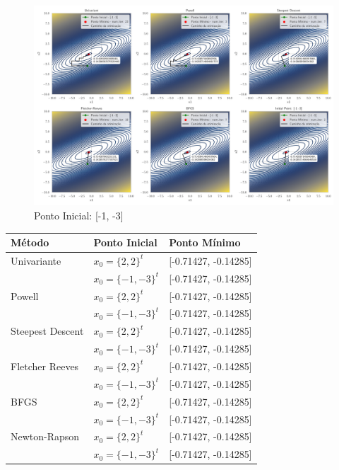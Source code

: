 \documentclass[12pt]{article}
\begin{document}
\begin{figure}[H]
  \centering
  \caption{Ponto Inicial: [-1, -3]}
  \includegraphics[scale=0.4]{img/questao_1a_[-1 -3].pdf}
\end{figure}

\begin{table}[H]
  \centering
  \begin{tabular}{lll}
    \hline
    \textbf{Método} & \textbf{Ponto Inicial} & \textbf{Ponto Mínimo} \\\hline
    Univariante & $x_{0} =\{2,2\}^{t}$ & [-0.71427, -0.14285]\\
     & $x_{0}=\{-1,-3\}^{t}$ & [-0.71427, -0.14285] \\\hline 
    Powell & $x_{0} =\{2,2\}^{t}$ & [-0.71427, -0.14285]\\
     & $x_{0}=\{-1,-3\}^{t}$ & [-0.71427, -0.14285] \\\hline 
    Steepest Descent & $x_{0} =\{2,2\}^{t}$ & [-0.71427, -0.14285] \\
     & $x_{0}=\{-1,-3\}^{t}$ & [-0.71427, -0.14285] \\\hline 
    Fletcher Reeves & $x_{0} =\{2,2\}^{t}$ & [-0.71427, -0.14285] \\
     & $x_{0}=\{-1,-3\}^{t}$ & [-0.71427, -0.14285] \\\hline 
    BFGS & $x_{0} =\{2,2\}^{t}$ & [-0.71427, -0.14285] \\
     & $x_{0}=\{-1,-3\}^{t}$ & [-0.71427, -0.14285] \\\hline 
    Newton-Rapson & $x_{0} =\{2,2\}^{t}$ & [-0.71427, -0.14285] \\
     & $x_{0}=\{-1,-3\}^{t}$ & [-0.71427, -0.14285] \\\hline 
  \end{tabular}
\end{table}
\end{document}
